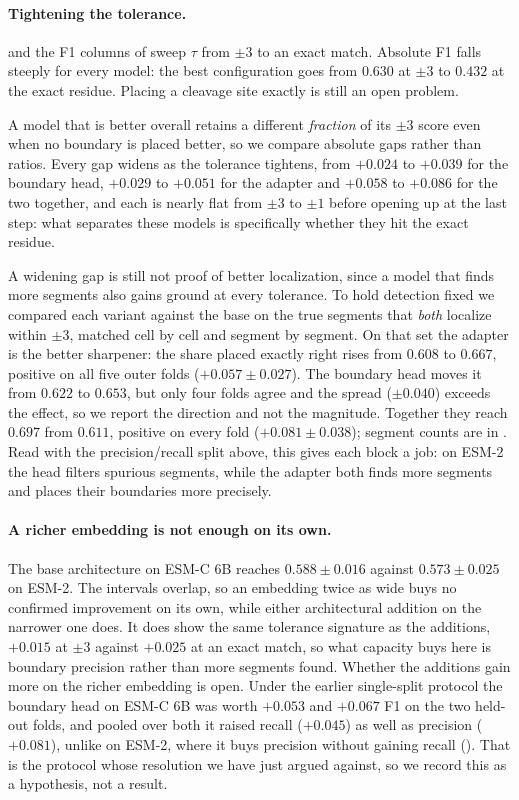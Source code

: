 \documentclass{article}
\begin{document}
\paragraph{Tightening the tolerance.}  and the F1 columns of  sweep $\tau$ from $\pm3$ to an exact match. Absolute F1 falls steeply for every model: the best configuration goes from $0.630$ at $\pm3$ to $0.432$ at the exact residue. Placing a cleavage site exactly is still an open problem.

A model that is better overall retains a different \emph{fraction} of its $\pm3$ score even when no boundary is placed better, so we compare absolute gaps rather than ratios. Every gap widens as the tolerance tightens, from $+0.024$ to $+0.039$ for the boundary head, $+0.029$ to $+0.051$ for the adapter and $+0.058$ to $+0.086$ for the two together, and each is nearly flat from $\pm3$ to $\pm1$ before opening up at the last step: what separates these models is specifically whether they hit the exact residue.

A widening gap is still not proof of better localization, since a model that finds more segments also gains ground at every tolerance. To hold detection fixed we compared each variant against the base on the true segments that \emph{both} localize within $\pm3$, matched cell by cell and segment by segment. On that set the adapter is the better sharpener: the share placed exactly right rises from $0.608$ to $0.667$, positive on all five outer folds ($+0.057\pm0.027$). The boundary head moves it from $0.622$ to $0.653$, but only four folds agree and the spread ($\pm0.040$) exceeds the effect, so we report the direction and not the magnitude. Together they reach $0.697$ from $0.611$, positive on every fold ($+0.081\pm0.038$); segment counts are in . Read with the precision/recall split above, this gives each block a job: on ESM-2 the head filters spurious segments, while the adapter both finds more segments and places their boundaries more precisely.

\paragraph{A richer embedding is not enough on its own.} The base architecture on ESM-C 6B reaches $0.588\pm0.016$ against $0.573\pm0.025$ on ESM-2. The intervals overlap, so an embedding twice as wide buys no confirmed improvement on its own, while either architectural addition on the narrower one does. It does show the same tolerance signature as the additions, $+0.015$ at $\pm3$ against $+0.025$ at an exact match, so what capacity buys here is boundary precision rather than more segments found. Whether the additions gain more on the richer embedding is open. Under the earlier single-split protocol the boundary head on ESM-C 6B was worth $+0.053$ and $+0.067$ F1 on the two held-out folds, and pooled over both it raised recall ($+0.045$) as well as precision ($+0.081$), unlike on ESM-2, where it buys precision without gaining recall (). That is the protocol whose resolution we have just argued against, so we record this as a hypothesis, not a result.
\end{document}
